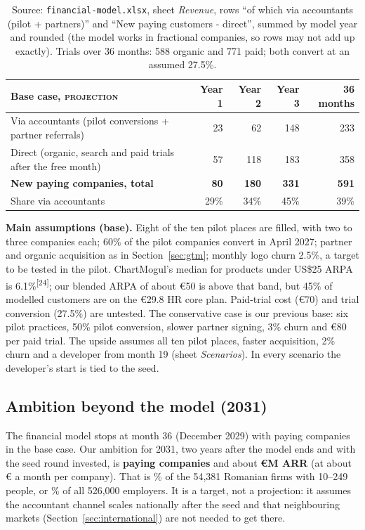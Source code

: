 \documentclass[10pt,a4paper]{article}
\newcommand{\fisier}[1]{\nolinkurl{#1}}
\newcommand{\src}[1]{\textsuperscript{\textcolor{brandSlate}{[#1]}}}
\newcommand{\proj}{\textcolor{brandTeal}{\textsc{projection}}}
\begin{document}
\begin{table}[H]
\centering\small
\begin{tabularx}{\linewidth}{@{}Lrrrr@{}}
\toprule
\textbf{Base case, \proj} & \textbf{Year 1} & \textbf{Year 2} & \textbf{Year 3} & \textbf{36 months} \\
\midrule
Via accountants (pilot conversions + partner referrals) & 23 & 62 & 148 & 233 \\
Direct (organic, search and paid trials after the free month) & 57 & 118 & 183 & 358 \\
\midrule
\textbf{New paying companies, total} & \textbf{80} & \textbf{180} & \textbf{331} & \textbf{591} \\
Share via accountants & 29\% & 34\% & 45\% & 39\% \\
\bottomrule
\end{tabularx}
\caption*{\footnotesize\color{brandSlate}Source: \fisier{financial-model.xlsx}, sheet
\textit{Revenue}, rows ``of which via accountants (pilot + partners)'' and ``New paying customers -
direct'', summed by model year and rounded (the model works in fractional companies, so rows may
not add up exactly). Trials over 36 months: 588 organic and 771 paid; both convert at an assumed
27.5\%.}
\end{table}

\textbf{Main assumptions (base).} Eight of the ten pilot places are filled, with two to three
companies each; 60\% of the pilot companies convert in April 2027; partner and organic acquisition as
in Section~\ref{sec:gtm}; monthly logo churn 2.5\%, a target to be tested in the pilot. ChartMogul's
median for products under US\$25 ARPA is 6.1\%\src{24}; our blended ARPA of about €50 is above that
band, but 45\% of modelled customers are on the €29.8 HR core plan. Paid-trial cost (€70) and trial
conversion (27.5\%) are untested. The conservative case is our previous base: six pilot practices,
50\% pilot conversion, slower partner signing, 3\% churn and €80 per paid trial. The upside assumes
all ten pilot places, faster acquisition, 2\% churn and a developer from month 19 (sheet
\textit{Scenarios}). In every scenario the developer's start is tied to the seed.

\subsection{Ambition beyond the model (2031)}\label{sec:ambitie}

The financial model stops at month 36 (December 2029) with  paying companies
in the base case. Our ambition for 2031, two years after the model ends and with the seed round
invested, is \textbf{ paying companies} and about
\textbf{€M ARR} (at about € a month per
company). That is \% of the 54,381 Romanian firms with 10--249
people, or \% of all 526,000 employers. It is a target, not
a projection: it assumes the accountant channel scales nationally after the seed and that
neighbouring markets (Section~\ref{sec:international}) are not needed to get there.
\end{document}
